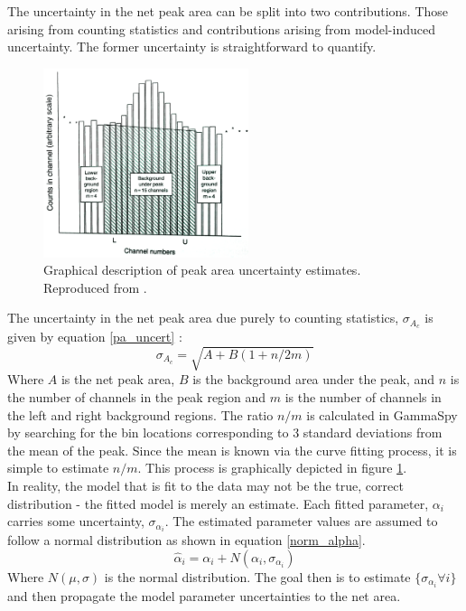 \documentclass[10pt]{article}
\begin{document}
The uncertainty in the net peak area can be split into two
contributions.  Those arising from counting statistics and contributions arising from
model-induced uncertainty. The former uncertainty is straightforward to quantify.  \\

\begin{figure}[!htbp]
\centering
\includegraphics[width=6cm]{images/peak_uncert.png}
\caption{Graphical description of peak area uncertainty estimates.  Reproduced from \cite{Gilmore:1995qr}.}
\label{peak_uncert}
\end{figure}
The uncertainty in the net peak area due purely to counting statistics, $\sigma_{A_c}$ is given by equation \ref{pa_uncert} \cite{Gilmore:1995qr}:
\begin{equation}
    \sigma_{A_c} = \sqrt{A + B(1 + n/2m)}
    \label{pa_uncert}
\end{equation}
Where $A$ is the net peak area, $B$ is the background area under the peak, and $n$ is the number of channels
in the peak region and $m$ is the number of channels in the left and right background regions.  The ratio
$n/m$ is calculated in GammaSpy by searching for the bin locations corresponding to 3 standard deviations
from the mean of the peak.  Since the mean is known via the curve fitting process, it is simple to estimate
$n/m$.  This process is graphically depicted in figure \ref{peak_uncert}. \\

In reality, the model that is fit to the data may not be
the true, correct distribution - the fitted model is merely an estimate.  Each
fitted parameter, $\alpha_i$ carries some uncertainty, $\sigma_{\alpha_i}$.  The estimated parameter values
are assumed to follow a normal distribution as shown in equation \ref{norm_alpha}.
\begin{equation}
\hat \alpha_i = \alpha_i + N(\alpha_i, \sigma_{\alpha_i})
\label{norm_alpha}
\end{equation}
Where $N(\mu, \sigma)$ is the normal distribution.  The goal then is to estimate
$\{\sigma_{\alpha_i} \forall i \}$ and then propagate the model parameter uncertainties to the net area. \\
\end{document}
